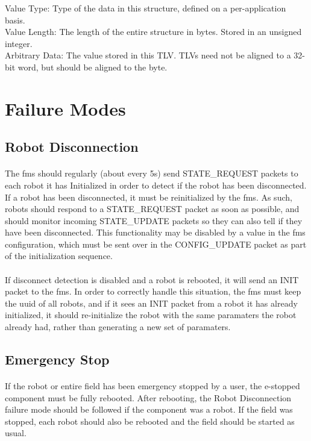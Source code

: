 \documentclass[11pt]{article}
\begin{document}
Value Type: Type of the data in this structure, defined on a per-application basis.\\
Value Length: The length of the entire structure in bytes.  Stored in an unsigned integer.\\
Arbitrary Data: The value stored in this TLV. TLVs need not be aligned to a 32-bit word, but should be aligned to the byte.

\clearpage

\section{Failure Modes}
\subsection{Robot Disconnection}
\paragraph{}
The \acrshort{fms} should regularly (about every 5s) send STATE\_REQUEST packets to each robot it has Initialized 
in order to detect if the robot has been disconnected.  If a robot has been disconnected, 
it must be reinitialized by the \acrshort{fms}.
As such, robots should respond to a STATE\_REQUEST packet as soon as possible, and should monitor incoming STATE\_UPDATE packets
so they can also tell if they have been disconnected.  This functionality may be disabled by a value in the \acrshort{fms}
configuration, which must be sent over in the CONFIG\_UPDATE packet as part of the initialization sequence.

\paragraph{}
If disconnect detection is disabled and a robot is rebooted, it will send an INIT packet to the \acrshort{fms}.
In order to correctly handle this situation, the \acrshort{fms} must keep the \acrshort{uuid} of all robots, 
and if it sees an INIT packet from a robot it has already initialized, 
it should re-initialize the robot with the same paramaters the robot already had, rather
than generating a new set of paramaters.

\subsection{Emergency Stop}
\paragraph{}
If the robot or entire field has been emergency stopped by a user, the e-stopped component must be fully rebooted.
After rebooting, the Robot Disconnection failure mode should be followed if the component was a robot.  
If the field was stopped, each robot should also be rebooted and the field should be started as usual.

\clearpage

\printglossary[type=\acronymtype]
\end{document}
